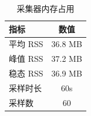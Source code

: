 \documentclass[11pt]{ctexart}
\begin{document}
\thispagestyle{empty}
\begin{table}[H]
\centering
\caption{采集器内存占用}
\small
\begin{tabular}{lc}
\toprule
\textbf{指标} & \textbf{数值} \\
\midrule
平均 RSS & 36.8 MB \\
峰值 RSS & 37.2 MB \\
稳态 RSS & 36.9 MB \\
采样时长 & 60s \\
采样数 & 60 \\
\bottomrule
\end{tabular}
\end{table}
\end{document}
